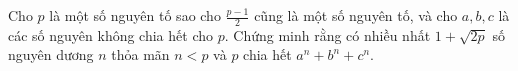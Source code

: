 \ifshowproblem
\begin{problem}\label{example:CAN-2015-MO-P5}
    Cho $p$ là một số nguyên tố sao cho $\frac{p-1}{2}$ cũng là một số nguyên tố, và cho $a, b, c$ là các số nguyên không chia hết cho $p$.
    Chứng minh rằng có nhiều nhất $1 + \sqrt{2p}$ số nguyên dương $n$ thỏa mãn $n < p$ và $p$ chia hết $a^n + b^n + c^n$.
\end{problem}
\fi

\footnotemark
{}
\fi